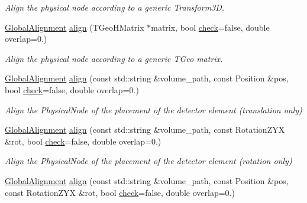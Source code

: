 \begin{DoxyCompactItemize}
\begin{DoxyCompactList}\small\item\em Align the physical node according to a generic Transform3D. \end{DoxyCompactList}\item 
\hyperlink{class_d_d4hep_1_1_alignments_1_1_global_alignment}{Global\+Alignment} \hyperlink{class_d_d4hep_1_1_alignments_1_1_global_detector_alignment_adbf2906a23e458e6d1630fecfe72678c}{align} (T\+Geo\+H\+Matrix $\ast$matrix, bool \hyperlink{class_d_d4hep_1_1_geometry_1_1_det_element_aee32c6df93ab1cb7d6dc36e7ae855112}{check}=false, double overlap=0.)
\begin{DoxyCompactList}\small\item\em Align the physical node according to a generic T\+Geo matrix. \end{DoxyCompactList}\item 
\hyperlink{class_d_d4hep_1_1_alignments_1_1_global_alignment}{Global\+Alignment} \hyperlink{class_d_d4hep_1_1_alignments_1_1_global_detector_alignment_ab789540ed6730b4440cc3a2fa716ad32}{align} (const std\+::string \&volume\+\_\+path, const Position \&pos, bool \hyperlink{class_d_d4hep_1_1_geometry_1_1_det_element_aee32c6df93ab1cb7d6dc36e7ae855112}{check}=false, double overlap=0.)
\begin{DoxyCompactList}\small\item\em Align the Physical\+Node of the placement of the detector element (translation only) \end{DoxyCompactList}\item 
\hyperlink{class_d_d4hep_1_1_alignments_1_1_global_alignment}{Global\+Alignment} \hyperlink{class_d_d4hep_1_1_alignments_1_1_global_detector_alignment_ad5277f0db4db98a272e2e58055d3e240}{align} (const std\+::string \&volume\+\_\+path, const Rotation\+Z\+YX \&rot, bool \hyperlink{class_d_d4hep_1_1_geometry_1_1_det_element_aee32c6df93ab1cb7d6dc36e7ae855112}{check}=false, double overlap=0.)
\begin{DoxyCompactList}\small\item\em Align the Physical\+Node of the placement of the detector element (rotation only) \end{DoxyCompactList}\item 
\hyperlink{class_d_d4hep_1_1_alignments_1_1_global_alignment}{Global\+Alignment} \hyperlink{class_d_d4hep_1_1_alignments_1_1_global_detector_alignment_ae58f439974af5028309077b14688d51b}{align} (const std\+::string \&volume\+\_\+path, const Position \&pos, const Rotation\+Z\+YX \&rot, bool \hyperlink{class_d_d4hep_1_1_geometry_1_1_det_element_aee32c6df93ab1cb7d6dc36e7ae855112}{check}=false, double overlap=0.)

\end{DoxyCompactItemize}
